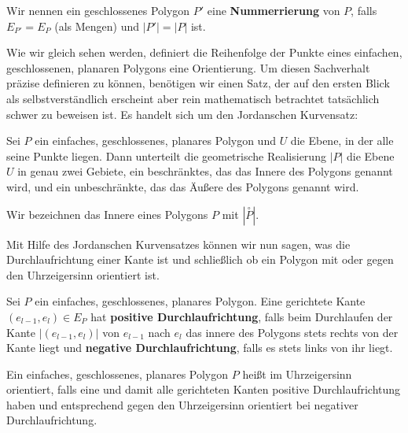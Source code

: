  

\begin{Definition}
Wir nennen  ein geschlossenes Polygon $P'$ eine \textbf{Nummerrierung} von $P$, falls 
$E_{P'} =E_{P}$ (als Mengen) und
$|P'| = |P|$ ist. 
\end{Definition}


Wie wir gleich sehen werden, definiert die Reihenfolge der Punkte eines einfachen, geschlossenen, planaren Polygons eine Orientierung. Um diesen Sachverhalt präzise definieren zu können, benötigen wir einen Satz, der 
auf den ersten Blick als selbstverständlich erscheint aber rein mathematisch betrachtet tatsächlich schwer zu beweisen ist. Es handelt sich um den Jordanschen Kurvensatz:

\begin{Satz}
Sei $P$ ein einfaches, geschlossenes, planares Polygon und $U$ die Ebene, in der alle seine Punkte liegen. 
Dann unterteilt die geometrische Realisierung $|P|$ die Ebene $U$ in genau zwei Gebiete, ein beschränktes, das das Innere des Polygons genannt wird, und ein unbeschränkte, das das Äußere des Polygons genannt wird.
\end{Satz}

\begin{Definition}
Wir bezeichnen das Innere eines Polygons $P$ mit $|\overset{\circ}{P}|$.
\end{Definition}

Mit Hilfe des Jordanschen Kurvensatzes können wir nun sagen, was die Durchlaufrichtung einer Kante ist und schließlich ob ein Polygon mit oder gegen den Uhrzeigersinn orientiert ist.

\begin{Definition}
Sei $P$ ein einfaches, geschlossenes, planares Polygon. Eine gerichtete Kante $(e_{l-1}, e_l) \in E_P$ hat \textbf{positive Durchlaufrichtung}, falls beim Durchlaufen der  Kante $|(e_{l-1}, e_l)|$ von $e_{l-1}$ nach $e_l$ das innere des Polygons stets rechts von der Kante liegt und \textbf{negative Durchlaufrichtung}, falls es stets links von ihr liegt. 
\end{Definition} 
 
\begin{Definition}
Ein einfaches, geschlossenes, planares Polygon $P$ heißt im Uhrzeigersinn orientiert, falls eine und damit alle gerichteten Kanten positive Durchlaufrichtung haben und entsprechend gegen den Uhrzeigersinn orientiert bei negativer Durchlaufrichtung.  
\end{Definition} 

